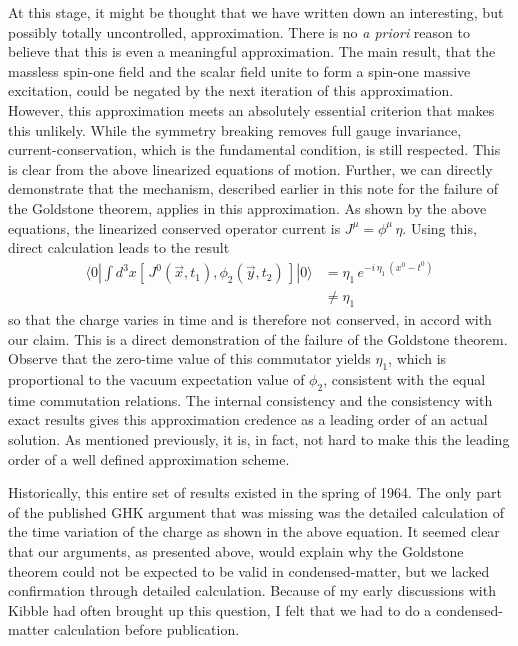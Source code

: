 \documentclass[12pt]{article}
\newcommand{\comm}[2]{\left[\,#1,#2\,\right]}
\newcommand{\ipop}[3]{\ensuremath{\langle#1 | #2 | #3\rangle}\xspace}
\begin{document}
At this stage, it might be thought that we have written down an
interesting, but possibly totally uncontrolled, approximation.  There
is no \emph{a priori} reason to believe that this is even a meaningful
approximation. The main result, that the massless spin-one field and
the scalar field unite to form a spin-one massive excitation, could
be negated by the next iteration of this approximation. However, this
approximation meets an absolutely essential criterion that makes this
unlikely. While the symmetry breaking removes full gauge invariance,
current-conservation, which is the fundamental condition, is still
respected. This is clear from the above linearized equations of
motion. Further, we can directly demonstrate that the mechanism,
described earlier in this note for the failure of the Goldstone
theorem, applies in this approximation. As shown by the above
equations, the linearized conserved operator current is $J^{\mu} =
\phi^{\mu}\,\eta$. Using this, direct calculation leads to the result
\begin{equation*} \begin{split} \ipop{0}{\int d^3x\comm{J^0(\vec{x},
t_1)}{\phi_2(\vec{y}, t_2)}}{0} &= \eta_1\, e^{-i\,\eta_1\,(x^0 -
t^0)} \\ &\neq \eta_1 \end{split} \end{equation*} so that the charge
varies in time and is therefore not conserved, in accord with our
claim. This is a direct demonstration of the failure of the Goldstone
theorem.  Observe that the zero-time value of this commutator yields
$\eta_1$, which is proportional to the vacuum expectation value of
$\phi_2$, consistent with the equal time commutation relations. The
internal consistency and the consistency with exact results gives this
approximation credence as a leading order of an actual solution. As
mentioned previously, it is, in fact, not hard to make this the leading
order of a well defined approximation scheme.

Historically, this entire set of results existed in the spring of 1964. The
only part of the published GHK argument that was missing was the detailed
calculation of the time variation of the charge as shown in the above
equation. It seemed clear that our arguments, as presented above, would
explain why the Goldstone theorem could not be expected to be valid in
condensed-matter, but we lacked confirmation through detailed
calculation. Because of my early discussions with Kibble had often brought up
this question, I felt that we had to do a condensed-matter calculation
before publication.
\end{document}
